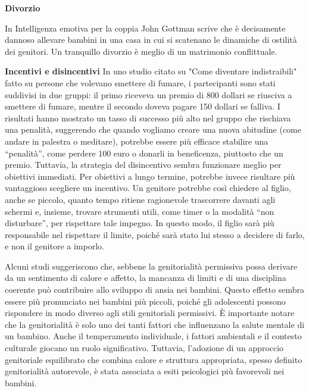 \documentclass[12pt]{book} %
\begin{document}
\textbf{Divorzio}

In Intelligenza emotiva per la coppia John Gottman scrive che è
decisamente dannoso allevare bambini in una casa in cui si scatenano le dinamiche di ostilità dei genitori. Un
tranquillo divorzio è meglio di un matrimonio conflittuale. 

\textbf{Incentivi e disincentivi}
In uno studio citato su "Come diventare indistraibili" fatto su persone che volevano smettere di fumare, i partecipanti sono stati suddivisi in due gruppi: il primo riceveva un premio di 800 dollari se riusciva a smettere di fumare, mentre il secondo doveva pagare 150 dollari se falliva. I risultati hanno mostrato un tasso di successo più alto nel gruppo che rischiava una penalità, suggerendo che quando vogliamo creare una nuova abitudine (come andare in palestra o meditare), potrebbe essere più efficace stabilire una “penalità”, come perdere 100 euro o donarli in beneficenza, piuttosto che un premio. Tuttavia, la strategia del disincentivo sembra funzionare meglio per obiettivi immediati. Per obiettivi a lungo termine, potrebbe invece risultare più vantaggioso scegliere un incentivo.
Un genitore potrebbe così chiedere al figlio, anche se piccolo, quanto tempo ritiene ragionevole trascorrere davanti agli schermi e, insieme, trovare strumenti utili, come timer o la modalità “non disturbare”, per rispettare tale impegno. In questo modo, il figlio sarà più responsabile nel rispettare il limite, poiché sarà stato lui stesso a decidere di farlo, e non il genitore a imporlo.

Alcuni studi   suggeriscono che, sebbene la genitorialità permissiva possa derivare da un sentimento di calore e affetto, la mancanza di limiti e di una disciplina coerente può contribuire allo sviluppo di ansia nei bambini. Questo effetto sembra essere più pronunciato nei bambini più piccoli, poiché gli adolescenti possono rispondere in modo diverso agli stili genitoriali permissivi. È importante notare che la genitorialità è solo uno dei tanti fattori che influenzano la salute mentale di un bambino. Anche il temperamento individuale, i fattori ambientali e il contesto culturale giocano un ruolo significativo. Tuttavia, l'adozione di un approccio genitoriale equilibrato che combina calore e struttura appropriata, spesso definito genitorialità autorevole, è stata associata a esiti psicologici più favorevoli nei bambini.
\end{document}
